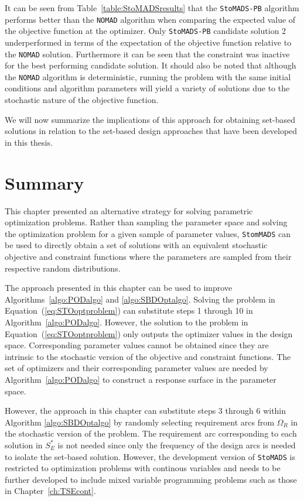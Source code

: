 It can be seen from Table~\ref{table:StoMADSresults} that the \texttt{StoMADS-PB} algorithm performs better than the \texttt{NOMAD} algorithm when comparing the expected value of the objective function at the optimizer. Only \texttt{StoMADS-PB} candidate solution 2 underperformed in terms of the expectation of the objective function relative to the \texttt{NOMAD} solution. Furthermore it can be seen that the constraint was inactive for the best performing candidate solution. It should also be noted that although the \texttt{NOMAD} algorithm is deterministic, running the problem with the same initial conditions and algorithm parameters will yield a variety of solutions due to the stochastic nature of the objective function.

We will now summarize the implications of this approach for obtaining set-based solutions in relation to the set-based design approaches that have been developed in this thesis.

\section{Summary}
\label{sec:stohasticoptsummary}

This chapter presented an alternative strategy for solving parametric optimization problems. Rather than sampling the parameter space and solving the optimization problem for a given sample of parameter values, \texttt{StomMADS} can be used to directly obtain a set of solutions with an equivalent stochastic objective and constraint functions where the parameters are sampled from their respective random distributions.

The approach presented in this chapter can be used to improve Algorithms~\ref{algo:PODalgo} and \ref{algo:SBDOptalgo}. Solving the problem in Equation~(\ref{eq:STOoptproblem}) can substitute steps 1 through 10 in Algorithm~\ref{algo:PODalgo}. However, the solution to the problem in Equation~(\ref{eq:STOoptproblem}) only outputs the optimizer values in the design space. Corresponding parameter values cannot be obtained since they are intrinsic to the stochastic version of the objective and constraint functions. The set of optimizers and their corresponding parameter values are needed by Algorithm~\ref{algo:PODalgo} to construct a response surface in the parameter space.

However, the approach in this chapter can substitute steps 3 through 6 within Algorithm \ref{algo:SBDOptalgo} by randomly selecting requirement arcs from $\Omega_R$ in the stochastic version of the problem. The requirement arc corresponding to each solution in $S_{E}^*$ is not needed since only the frequency of the design arcs is needed to isolate the set-based solution. However, the development version of \texttt{StoMADS} is restricted to optimization problems with continous variables and needs to be further developed to include mixed variable programming problems such as those in Chapter~\ref{ch:TSEcont}.

